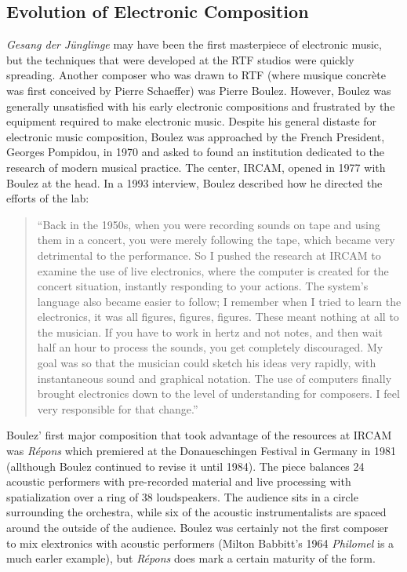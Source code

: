 \subsection{Evolution of Electronic Composition}
\label{sec:evolution-of-electronic-composition}
\textit{Gesang der J\"{u}nglinge} may have been the first masterpiece
of electronic music, but the techniques that were developed at the RTF
studios were quickly spreading. Another composer who was drawn to RTF
(where musique concr\`{e}te was first conceived by Pierre Schaeffer)
was Pierre Boulez. However, Boulez was generally unsatisfied with his
early electronic compositions and frustrated by the equipment required
to make electronic music. Despite his general distaste for electronic
music composition, Boulez was approached by the French President,
Georges Pompidou, in 1970 and asked to found an institution dedicated
to the research of modern musical practice. The center, IRCAM, opened in 1977
with Boulez at the head. In a 1993 interview, Boulez described how he
directed the efforts of the lab:
\begin{quotation}
  ``Back in the 1950s, when you were recording sounds on tape and using
  them in a concert, you were merely following the tape, which became
  very detrimental to the performance. So I pushed the research at
  IRCAM to examine the use of live electronics, where the computer is
  created for the concert situation, instantly responding to your
  actions. The system's language also became easier to follow; I
  remember when I tried to learn the electronics, it was all figures,
  figures, figures. These meant nothing at all to the musician. If you
  have to work in hertz and not notes, and then wait half an hour to
  process the sounds, you get completely discouraged. My goal was so
  that the musician could sketch his ideas very rapidly, with
  instantaneous sound and graphical notation. The use of computers
  finally brought electronics down to the level of understanding for
  composers. I feel very responsible for that change.''\cite{Carvin1993}
\end{quotation}
Boulez' first major composition that took advantage of the resources
at IRCAM was \textit{R\'{e}pons} which premiered at the Donaueschingen
Festival in Germany in 1981 (allthough Boulez continued to revise it
until 1984). The piece balances 24 acoustic performers with
pre-recorded material and live processing with spatialization over a
ring of 38 loudspeakers. The audience sits in a circle surrounding the
orchestra, while six of the acoustic instrumentalists are spaced
around the outside of the audience. Boulez was certainly not the first
composer to mix elextronics with acoustic performers (Milton
Babbitt's 1964 \textit{Philomel} is a much earler example), but
\textit{R\'{e}pons} does mark a certain maturity of the form.

